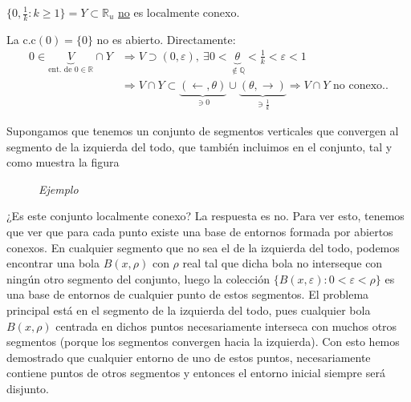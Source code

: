 \begin{ej}[Esencial]
$\{0, \frac{1}{k} : k \ge 1\} = Y \subset \mathbb{R}_u$ \underline{no} es localmente conexo. 
\begin{demo}
    La $\text{c.c}\left( 0 \right) = \{0\}$ no es abierto. Directamente:
    \begin{align*}
        0 \in \underbrace{V}_{\text{ent. de } 0 \in \mathbb{R}} \cap Y &\Rightarrow V \supset \left( 0, \varepsilon \right),\ \exists 0 < \underbrace{\theta}_{\not\in \mathbb{Q}} < \frac{1}{k} < \varepsilon < 1\\
        &\Rightarrow V\cap Y \subset \underbrace{\left( \leftarrow, \theta \right)}_{\ni 0} \cup \underbrace{\left( \theta, \rightarrow \right)}_{\ni \frac{1}{k}}  \Rightarrow V \cap Y \text{ no conexo.} 
    .\end{align*}
\end{demo}
\end{ej}

\begin{ej}
Supongamos que tenemos un conjunto de segmentos verticales que convergen al segmento de la izquierda del todo, que también incluimos en el conjunto, tal y como muestra la figura
    \begin{figure}[H]
        \centering
        \caption{\textit{Ejemplo}}
    \end{figure}
¿Es este conjunto localmente conexo? La respuesta es no. Para ver esto, tenemos que ver que para cada punto existe una base de entornos formada por abiertos conexos. En cualquier segmento que no sea el de la izquierda del todo, podemos encontrar una bola $B(x,\rho)$ con $\mathbb{\rho}$ real tal que dicha bola no interseque con ningún otro segmento del conjunto, luego la colección $\{B(x,\varepsilon) : 0 < \varepsilon < \rho\}$ es una base de entornos de cualquier punto de estos segmentos. El problema principal está en el segmento de la izquierda del todo, pues cualquier bola $B(x,\rho)$ centrada en dichos puntos necesariamente interseca con muchos otros segmentos (porque los segmentos convergen hacia la izquierda). Con esto hemos demostrado que cualquier entorno de uno de estos puntos, necesariamente contiene puntos de otros segmentos y entonces el entorno inicial siempre será disjunto.
\end{ej}

